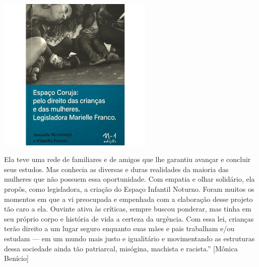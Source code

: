 \pagebreak %

\begin{center}
\hspace*{-3.6cm}
\hspace*{3.1cm}\includegraphics[width=74mm]{./grid/coruja.jpg}
\end{center}

\hspace*{-7cm}\hrulefill\hspace*{-7cm}

\medskip

\noindent{} Ela teve uma rede de familiares e de amigos que lhe garantiu avançar e concluir seus estudos. Mas conhecia as diversas e duras realidades da maioria das mulheres que não possuem essa oportunidade. Com empatia e olhar solidário, ela propôs, como legisladora, a criação do Espaço Infantil Noturno. Foram muitos os momentos em que a vi preocupada e empenhada com a elaboração desse projeto tão caro a ela. Ouvinte ativa às críticas, sempre buscou ponderar, mas tinha em seu próprio corpo e história de vida a certeza da urgência. Com essa lei, crianças terão direito a um lugar seguro enquanto suas mães e pais trabalham e/ou estudam --- em um mundo mais justo e igualitário e movimentando as estruturas dessa sociedade ainda tão patriarcal, misógina, machista e racista.” [Mônica Benício]


\vfill

